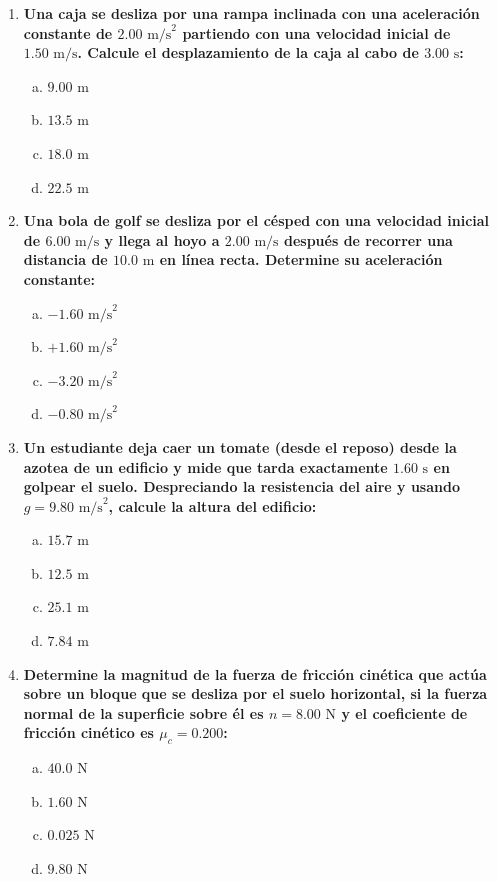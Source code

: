 \documentclass[11pt,a4paper]{article}
\begin{document}
\begin{enumerate}
    \item \textbf{Una caja se desliza por una rampa inclinada con una aceleración constante de $2.00 \text{ m/s}^2$ partiendo con una velocidad inicial de $1.50 \text{ m/s}$. Calcule el desplazamiento de la caja al cabo de $3.00 \text{ s}$:}
    \begin{enumerate}[a)]
        \item $9.00 \text{ m}$
        \item $13.5 \text{ m}$
        \item $18.0 \text{ m}$
        \item $22.5 \text{ m}$
    \end{enumerate}

    \item \textbf{Una bola de golf se desliza por el césped con una velocidad inicial de $6.00 \text{ m/s}$ y llega al hoyo a $2.00 \text{ m/s}$ después de recorrer una distancia de $10.0 \text{ m}$ en línea recta. Determine su aceleración constante:}
    \begin{enumerate}[a)]
        \item $-1.60 \text{ m/s}^2$
        \item $+1.60 \text{ m/s}^2$
        \item $-3.20 \text{ m/s}^2$
        \item $-0.80 \text{ m/s}^2$
    \end{enumerate}

    \item \textbf{Un estudiante deja caer un tomate (desde el reposo) desde la azotea de un edificio y mide que tarda exactamente $1.60 \text{ s}$ en golpear el suelo. Despreciando la resistencia del aire y usando $g = 9.80 \text{ m/s}^2$, calcule la altura del edificio:}
    \begin{enumerate}[a)]
        \item $15.7 \text{ m}$
        \item $12.5 \text{ m}$
        \item $25.1 \text{ m}$
        \item $7.84 \text{ m}$
    \end{enumerate}

    \item \textbf{Determine la magnitud de la fuerza de fricción cinética que actúa sobre un bloque que se desliza por el suelo horizontal, si la fuerza normal de la superficie sobre él es $n = 8.00 \text{ N}$ y el coeficiente de fricción cinético es $\mu_c = 0.200$:}
    \begin{enumerate}[a)]
        \item $40.0 \text{ N}$
        \item $1.60 \text{ N}$
        \item $0.025 \text{ N}$
        \item $9.80 \text{ N}$
    \end{enumerate}


\end{enumerate}
\end{document}
